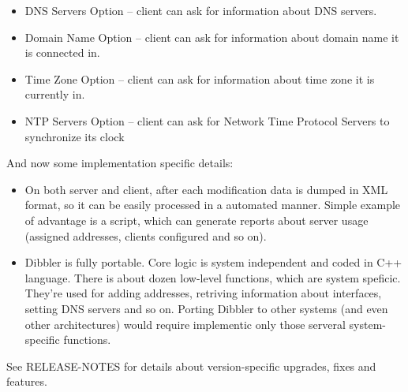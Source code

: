\begin{itemize}
\item DNS Servers Option -- client can ask for information about DNS
  servers. 
\item Domain Name Option -- client can ask for information about
  domain name it is connected in.
\item Time Zone Option -- client can ask for information about 
time zone it is currently in.
\item NTP Servers Option -- client can ask for Network Time Protocol
  Servers to synchronize its clock
\end{itemize}

And now some implementation specific details:
\begin{itemize}
\item On both server and client, after each modification data is
  dumped in XML format, so it can be easily processed in a automated
  manner. Simple example of advantage is a script, which can generate
  reports about server usage (assigned addresses, clients configured
  and so on).
\item Dibbler is fully portable. Core logic is system independent and
  coded in C++ language. There is about dozen low-level functions,
  which are system speficic. They're used for adding addresses,
  retriving information about interfaces, setting DNS servers and so
  on. Porting Dibbler to other systems (and even other architectures)
  would require implementic only those serveral system-specific
  functions.
\end{itemize}

See RELEASE-NOTES for details about version-specific upgrades, fixes
and features.